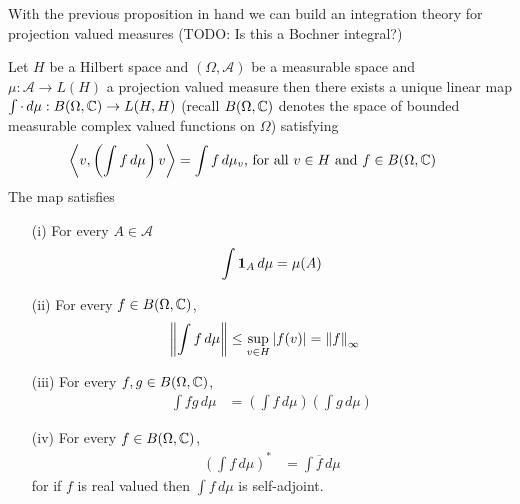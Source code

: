 With the previous proposition in hand we can build an integration theory for projection valued measures (TODO: Is this a Bochner integral?)
\begin{prop}\label{hilbert:OperatorValuedIntegration}Let $H$ be a Hilbert space and $(\Omega, \mathcal{A})$ be a measurable space and $\mu : \mathcal{A} \to L(H)$ a projection valued measure then there exists a unique linear map $\int \cdot \, d\mu : B(\Omega, \mathbb{C}) \to L(H,H)$ (recall $B(\Omega, \mathbb{C})$ denotes the space of bounded measurable complex valued functions on $\Omega$) satisfying
\begin{align}\label{hilbert:DefiningPropertyOfOperatorIntegral}
\left \langle v, \left(\int f \, d\mu \right) v \right \rangle &= \int f \, d\mu_v \text{, for all $v \in H$ and $f \in B(\Omega, \mathbb{C})$}
\end{align}
The map satisfies
\begin{itemize}
\item[(i)] For every $A \in \mathcal{A}$ 
\begin{align*}
\int \textbf{1}_{A} \, d\mu = \mu(A)
\end{align*}
\item[(ii)] For every $f \in B(\Omega, \mathbb{C})$, 
\begin{align*}
\left \lVert \int f \, d\mu \right \rVert &\leq \sup_{v \in H} \left \vert f(v) \right \vert = \left \lVert f \right \rVert_\infty
\end{align*}
\item[(iii)] For every $f,g  \in B(\Omega, \mathbb{C})$, 
\begin{align*}
\int f g \, d\mu &= \left ( \int f \, d\mu \right ) \left ( \int g \, d\mu \right )
\end{align*}
\item[(iv)] For every $f \in B(\Omega, \mathbb{C})$, 
\begin{align*}
\left( \int f \, d\mu \right)^*  &= \int \overline{f} \, d\mu 
\end{align*}
for if $f$ is real valued then $\int f \, d\mu$ is self-adjoint.
\end{itemize}
\end{prop}
